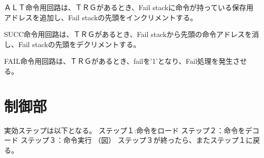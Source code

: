 \documentclass[12pt,oneside]{report}
\begin{document}
ＡＬＴ命令用回路は、ＴＲＧがあるとき、Fail stackに命令が持っている保存用アドレスを追加し、Fail stackの先頭をインクリメントする。

SUCC命令用回路は、ＴＲＧがあるとき、Fail stackから先頭の命令アドレスを消し、Fail stackの先頭をデクリメントする。

FAIL命令用回路は、ＴＲＧがあるとき、failを'1'となり、Fail処理を発生させる。


\section{制御部}
実効ステップは以下となる。
ステップ１:命令をロード
ステップ２：命令をデコード
ステップ３：命令実行
（図）
ステップ３が終ったら、またステップ１に戻る。








\end{document}
